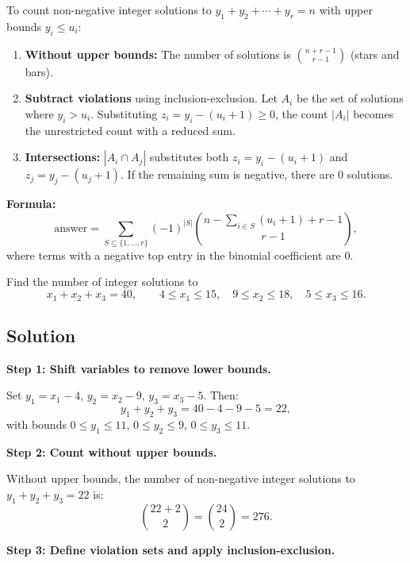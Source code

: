 \documentclass[12pt, a4paper]{article}
\begin{document}
\begin{theorybox}
To count non-negative integer solutions to $y_1 + y_2 + \cdots + y_r = n$
with upper bounds $y_i \le u_i$:

\begin{enumerate}[nosep]
  \item \textbf{Without upper bounds:}\;
        The number of solutions is $\binom{n+r-1}{r-1}$ (stars and bars).
  \item \textbf{Subtract violations} using inclusion-exclusion.
        Let $A_i$ be the set of solutions where $y_i > u_i$.
        Substituting $z_i = y_i - (u_i + 1) \ge 0$, the count $|A_i|$
        becomes the unrestricted count with a reduced sum.
  \item \textbf{Intersections:}\;
        $|A_i \cap A_j|$ substitutes both $z_i = y_i - (u_i+1)$
        and $z_j = y_j - (u_j+1)$.
        If the remaining sum is negative, there are $0$ solutions.
\end{enumerate}

\medskip
\textbf{Formula:}
\[
  \text{answer} = \sum_{S \subseteq \{1,\ldots,r\}} (-1)^{|S|}
  \binom{n - \sum_{i \in S}(u_i+1) + r - 1}{r-1},
\]
where terms with a negative top entry in the binomial coefficient are $0$.
\end{theorybox}

\begin{problembox}
Find the number of integer solutions to
\[
  x_1 + x_2 + x_3 = 40, \qquad
  4 \le x_1 \le 15, \quad
  9 \le x_2 \le 18, \quad
  5 \le x_3 \le 16.
\]
\end{problembox}

\subsection*{Solution}

\textbf{Step 1: Shift variables to remove lower bounds.}

Set $y_1 = x_1 - 4$,\; $y_2 = x_2 - 9$,\; $y_3 = x_3 - 5$.
Then:
\[
  y_1 + y_2 + y_3 = 40 - 4 - 9 - 5 = 22,
\]
with bounds $0 \le y_1 \le 11$,\; $0 \le y_2 \le 9$,\; $0 \le y_3 \le 11$.

\textbf{Step 2: Count without upper bounds.}

Without upper bounds, the number of non-negative integer solutions to
$y_1 + y_2 + y_3 = 22$ is:
\[
  \binom{22 + 2}{2} = \binom{24}{2} = 276.
\]

\textbf{Step 3: Define violation sets and apply inclusion-exclusion.}
\end{document}
